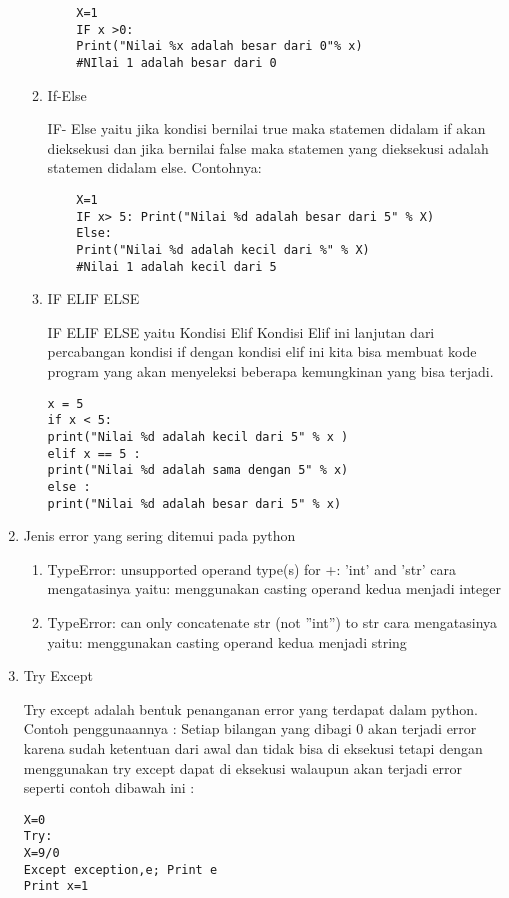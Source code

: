\documentclass{article}
\begin{document}
\begin{enumerate}
\begin{enumerate}
\begin{verbatim}
    X=1 
    IF x >0: 
    Print("Nilai %x adalah besar dari 0"% x) 
    #NIlai 1 adalah besar dari 0
\end{verbatim}
\item If-Else 
\par IF- Else yaitu jika kondisi bernilai true maka statemen didalam if akan dieksekusi dan jika bernilai false maka statemen yang dieksekusi adalah statemen didalam else. Contohnya:
\begin{verbatim}
	X=1 
	IF x> 5: Print("Nilai %d adalah besar dari 5" % X) 
	Else: 
	Print("Nilai %d adalah kecil dari %" % X) 
	#Nilai 1 adalah kecil dari 5
\end{verbatim}
\item IF ELIF ELSE 
\par IF ELIF ELSE yaitu Kondisi Elif Kondisi Elif ini lanjutan dari percabangan kondisi if dengan kondisi elif ini kita bisa membuat kode program yang akan menyeleksi beberapa kemungkinan yang bisa terjadi. 
\begin{verbatim}
x = 5 
if x < 5: 
print("Nilai %d adalah kecil dari 5" % x ) 
elif x == 5 : 
print("Nilai %d adalah sama dengan 5" % x) 
else : 
print("Nilai %d adalah besar dari 5" % x)
\end{verbatim}
\end{enumerate}
\item Jenis error yang sering ditemui pada python
\begin{enumerate}
\item  TypeError: unsupported operand type(s) for +: ’int’ and ’str’ cara mengatasinya yaitu: menggunakan casting operand kedua menjadi integer
\item  TypeError: can only concatenate str (not ”int”) to str cara mengatasinya yaitu: menggunakan casting operand kedua menjadi string
\end{enumerate}
\item Try Except
\par Try except adalah bentuk penanganan error yang terdapat dalam python. Contoh penggunaannya : Setiap bilangan yang dibagi 0 akan terjadi error karena sudah ketentuan dari awal dan tidak bisa di eksekusi tetapi dengan menggunakan try except dapat di eksekusi walaupun akan terjadi error seperti contoh dibawah ini :
\begin{verbatim}
X=0 
Try: 
X=9/0 
Except exception,e; Print e
Print x=1
\end{verbatim}
\end{enumerate}
\end{document}
